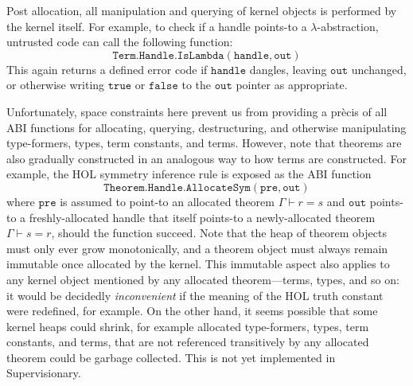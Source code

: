 \documentclass[sigplan, review]{acmart}
\begin{document}
Post allocation, all manipulation and querying of kernel objects is performed by the kernel itself.
For example, to check if a handle points-to a $\lambda$-abstraction, untrusted code can call the following function:
\begin{displaymath}
\mathtt{Term.Handle.IsLambda(handle, out)}
\end{displaymath}
This again returns a defined error code if $\mathtt{handle}$ dangles, leaving $\mathtt{out}$ unchanged, or otherwise writing $\mathtt{true}$ or $\mathtt{false}$ to the $\mathtt{out}$ pointer as appropriate.

Unfortunately, space constraints here prevent us from providing a pr\`{e}cis of all ABI functions for allocating, querying, destructuring, and otherwise manipulating type-formers, types, term constants, and terms.
However, note that theorems are also gradually constructed in an analogous way to how terms are constructed.
For example, the HOL symmetry inference rule is exposed as the ABI function
\begin{displaymath}
\mathtt{Theorem.Handle.AllocateSym(pre, out)}
\end{displaymath}
where $\mathtt{pre}$ is assumed to point-to an allocated theorem $\Gamma \vdash r = s$ and $\mathtt{out}$ points-to a freshly-allocated handle that itself points-to a newly-allocated theorem $\Gamma \vdash s = r$, should the function succeed.
Note that the heap of theorem objects must only ever grow monotonically, and a theorem object must always remain immutable once allocated by the kernel.
This immutable aspect also applies to any kernel object mentioned by any allocated theorem---terms, types, and so on: it would be decidedly \emph{inconvenient} if the meaning of the HOL truth constant were redefined, for example.
On the other hand, it seems possible that some kernel heaps could shrink, for example allocated type-formers, types, term constants, and terms, that are not referenced transitively by any allocated theorem could be garbage collected.
This is not yet implemented in Supervisionary.
\end{document}

